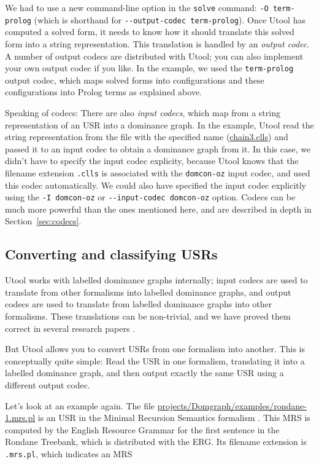 We had to use a new command-line option in the \verb?solve? command:
\verb?-O term-prolog? (which is shorthand for
\verb?--output-codec term-prolog?). Once Utool has computed a solved
form, it needs to know how it should translate this solved form into a
string representation. This translation is handled by an \emph{output
codec}. A number of output codecs are distributed with Utool; you can
also implement your own output codec if you like. In the example, we
used the \verb?term-prolog? output codec, which maps solved forms into
configurations and these configurations into Prolog terms as explained
above.

Speaking of codecs: There are also \emph{input codecs}, which map from
a string representation of an USR into a dominance graph. In the
example, Utool read the string representation from the file with the
specified name (\url{chain3.clls}) and passed it to an input codec to
obtain a dominance graph from it. In this case, we didn't have to
specify the input codec explicity, because Utool knows that the
filename extension \verb?.clls? is associated with the
\verb?domcon-oz? input codec, and used this codec automatically. We
could also have specified the input codec explicitly using the
\verb?-I domcon-oz? or \verb?--input-codec domcon-oz? option. Codecs
can be much more powerful than the ones mentioned here, and are
described in depth in Section~\ref{sec:codecs}.

 
\subsection{Converting and classifying USRs}

Utool works with labelled dominance graphs internally; input codecs
are used to translate from other formalisms into labelled dominance
graphs, and output codecs are used to translate from labelled
dominance graphs into other formalisms. These translations can be
non-trivial, and we have proved them correct in several research
papers \cite{KolNieTha03,mrs-dom}.

But Utool allows you to convert USRs from one formalism into
another. This is conceptually quite simple: Read the USR in one
formalism, translating it into a labelled dominance graph, and then
output exactly the same USR using a different output codec.

Let's look at an example again. The file
\url{projects/Domgraph/examples/rondane-1.mrs.pl} is an USR in the
Minimal Recursion Semantics formalism \cite{CopFliSag97}. This MRS is
computed by the English Resource Grammar
\cite{Copestake&Flickinger:LKB} for the first sentence in the Rondane
Treebank, which is distributed with the ERG. Its filename extension is
\verb?.mrs.pl?, which indicates an MRS 







